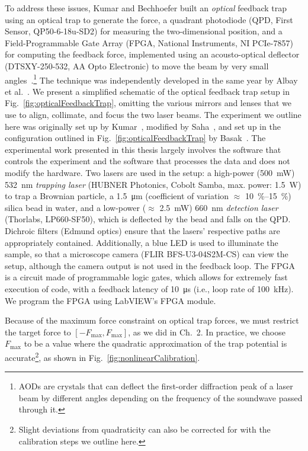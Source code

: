\documentclass[hyperref={colorlinks=true, urlcolor=blue, citecolor=blue, final, bound}]{sfuthesis}
\begin{document}
To address these issues, Kumar and Bechhoefer built an \textit{optical} feedback trap using an optical trap to generate the force, a quadrant photodiode (QPD, First Sensor, QP50-6-18u-SD2) for measuring the two-dimensional position, and a Field-Programmable Gate Array (FPGA, National Instruments, NI PCIe-7857) for computing the feedback force, implemented using an acousto-optical deflector (DTSXY-250-532, AA
Opto Electronic) to move the beam by very small angles~\cite{Kumar2018a}.\footnote{AODs are crystals that can deflect the first-order diffraction peak of a laser beam by different angles depending on the frequency of the soundwave passed through it.} The technique was independently developed in the same year by Albay et al.~\cite{Albay2018}. We present a simplified schematic of the optical feedback trap setup in Fig.~\ref{fig:opticalFeedbackTrap}, omitting the various mirrors and lenses that we use to align, collimate, and focus the two laser beams. The experiment we outline here was originally set up by Kumar~\cite{Kumar2022a}, modified by Saha~\cite{Saha2023a}, and set up in the configuration outlined in Fig.~\ref{fig:opticalFeedbackTrap} by Basak~\cite{Basak2026}. The experimental work presented in this thesis largely involves the software that controls the experiment and the software that processes the data and does not modify the hardware. Two lasers are used in the setup: a high-power (\qty{500}{\milli\watt}) \qty{532}{\nano\metre} \textit{trapping laser} (HUBNER Photonics,
Cobolt Samba, max. power: \qty{1.5}{\watt}) to trap a Brownian particle, a \qty{1.5}{\micro\metre} (coefficient of variation $\approx$ \qtyrange{10}{15}{\percent}) silica bead in water, and a low-power ($\approx$ \qty{2.5}{\milli\watt}) \qty{660}{\nano\metre} \textit{detection laser} (Thorlabs, LP660-SF50), which is deflected by the bead and falls on the QPD. Dichroic filters (Edmund optics) ensure that the lasers' respective paths are appropriately contained. Additionally, a blue LED is used to illuminate the sample, so that a microscope camera (FLIR BFS-U3-04S2M-CS) can view the setup, although the camera output is not used in the feedback loop. The FPGA is a circuit made of programmable logic gates, which allows for extremely fast execution of code, with a feedback latency of \qty{10}{\micro\second} (i.e., loop rate of \qty{100}{\kilo\hertz}). We program the FPGA using LabVIEW's FPGA module. 

Because of the maximum force constraint on optical trap forces, we must restrict the target force to $[-F_{\max}, F_{\max}]$, as we did in Ch.~2. In practice, we choose $F_{\max}$ to be a value where the quadratic approximation of the trap potential is accurate\footnote{Slight deviations from quadraticity can also be corrected for with the calibration steps we outline here.}, as shown in Fig.~\ref{fig:nonlinearCalibration}.
\end{document}
